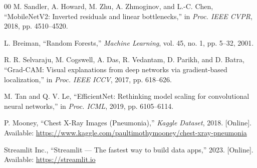 \documentclass[conference]{IEEEtran}
\begin{document}
\begin{thebibliography}{00}
M. Sandler, A. Howard, M. Zhu, A. Zhmoginov, and
L.-C. Chen,
``MobileNetV2: Inverted residuals and linear bottlenecks,''
in \textit{Proc. IEEE CVPR}, 2018, pp. 4510--4520.

L. Breiman,
``Random Forests,''
\textit{Machine Learning}, vol. 45, no. 1, pp. 5--32, 2001.

R. R. Selvaraju, M. Cogswell, A. Das, R. Vedantam,
D. Parikh, and D. Batra,
``Grad-CAM: Visual explanations from deep networks via
gradient-based localization,''
in \textit{Proc. IEEE ICCV}, 2017, pp. 618--626.

M. Tan and Q. V. Le,
``EfficientNet: Rethinking model scaling for convolutional
neural networks,''
in \textit{Proc. ICML}, 2019, pp. 6105--6114.

P. Mooney, ``Chest X-Ray Images (Pneumonia),''
\textit{Kaggle Dataset}, 2018. [Online]. Available:
\url{https://www.kaggle.com/paultimothymooney/chest-xray-pneumonia}

Streamlit Inc., ``Streamlit --- The fastest way to build
data apps,'' 2023. [Online]. Available:
\url{https://streamlit.io}

\end{thebibliography}
\end{document}

